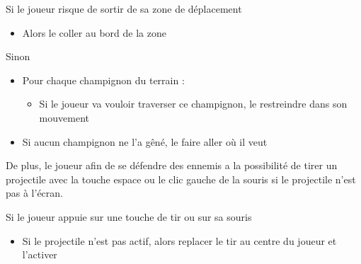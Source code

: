 \begin{algoinfo}
	\item Si le joueur risque de sortir de sa zone de déplacement
	\begin{itemize}
		\item Alors le coller au bord de la zone
	\end{itemize}
	\item Sinon
	\begin{itemize}
		\item Pour chaque champignon du terrain :
		\begin{itemize}
			\item Si le joueur va vouloir traverser ce champignon, le restreindre dans son mouvement
		\end{itemize}
		\item Si aucun champignon ne l'a gêné, le faire aller où il veut
	\end{itemize}
\end{algoinfo}


De plus, le joueur afin de se défendre des ennemis a la possibilité de tirer un projectile avec la touche espace ou le clic gauche de la souris si le projectile n'est pas à l'écran.
\begin{algoinfo}
	\item Si le joueur appuie sur une touche de tir ou sur sa souris
	\begin{itemize}
		\item Si le projectile n'est pas actif, alors replacer le tir au centre du joueur et l'activer
	\end{itemize}
\end{algoinfo}


